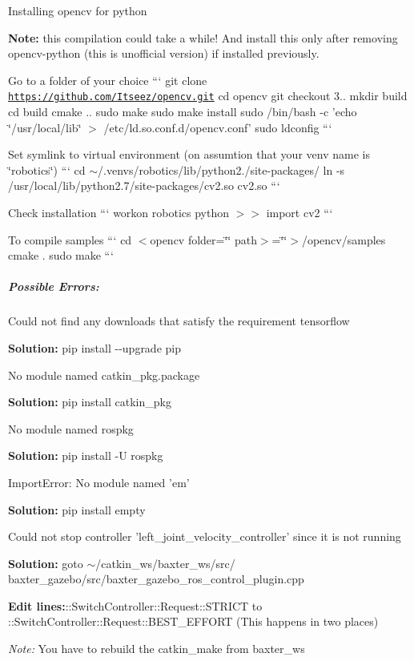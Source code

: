 \begin{DoxyEnumerate}
\item Installing opencv for python

{\bfseries Note\-:} this compilation could take a while! And install this only after removing opencv-\/python (this is unofficial version) if installed previously.
\begin{DoxyItemize}
\item Go to a folder of your choice ``` git clone \href{https://github.com/Itseez/opencv.git}{\tt https\-://github.\-com/\-Itseez/opencv.\-git} cd opencv git checkout 3.. mkdir build cd build cmake .. sudo make sudo make install sudo /bin/bash -\/c 'echo \char`\"{}/usr/local/lib\char`\"{} $>$ /etc/ld.so.\-conf.\-d/opencv.conf' sudo ldconfig ```
\item Set symlink to virtual environment (on assumtion that your venv name is \char`\"{}robotics\char`\"{}) ``` cd $\sim$/.venvs/robotics/lib/python2./site-\/packages/ ln -\/s /usr/local/lib/python2.7/site-\/packages/cv2.\-so cv2.\-so ```
\item Check installation ``` workon robotics python $>$$>$ import cv2 ```
\item To compile samples ``` cd $<$opencv folder=\char`\"{}\char`\"{} path$>$=\char`\"{}\char`\"{}$>$/opencv/samples cmake . sudo make ```
\end{DoxyItemize}
\end{DoxyEnumerate}

\subparagraph*{Possible Errors\-:}


\begin{DoxyEnumerate}
\item Could not find any downloads that satisfy the requirement tensorflow

{\bfseries Solution\-:} {\ttfamily pip install -\/-\/upgrade pip}
\item No module named catkin\-\_\-pkg.\-package

{\bfseries Solution\-:} {\ttfamily pip install catkin\-\_\-pkg}
\item No module named rospkg

{\bfseries Solution\-:} {\ttfamily pip install -\/\-U rospkg}
\item Import\-Error\-: No module named 'em'

{\bfseries Solution\-:} {\ttfamily pip install empty}
\item Could not stop controller 'left\-\_\-joint\-\_\-velocity\-\_\-controller' since it is not running

{\bfseries Solution\-:} goto {\ttfamily $\sim$/catkin\-\_\-ws/baxter\-\_\-ws/src/ baxter\-\_\-gazebo/src/baxter\-\_\-gazebo\-\_\-ros\-\_\-control\-\_\-plugin.\-cpp}

{\bfseries Edit lines\-:}{\ttfamily \-::\-Switch\-Controller\-::\-Request\-::\-S\-T\-R\-I\-C\-T to \-::\-Switch\-Controller\-::\-Request\-::\-B\-E\-S\-T\-\_\-\-E\-F\-F\-O\-R\-T} (This happens in two places)

{\itshape Note\-:} You have to rebuild the catkin\-\_\-make from baxter\-\_\-ws 
\end{DoxyEnumerate}
